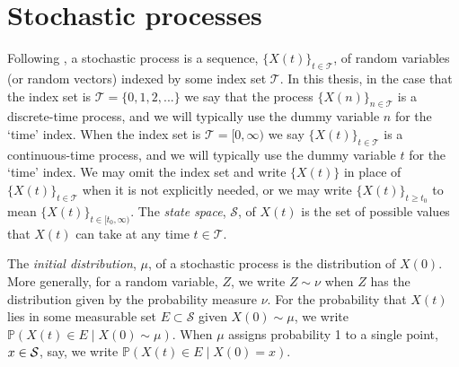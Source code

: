 		
\section{Stochastic processes}






Following \cite{rossBook}, a stochastic process is a sequence, \(\{X(t)\}_{t\in\mathcal T}\), of random variables (or random vectors) indexed by some index set \(\mathcal T\). In this thesis, in the case that the index set is \(\mathcal T=\{0,1,2,...\}\) we say that the process \(\{X(n)\}_{n\in \mathcal T}\) is a discrete-time process, and we will typically use the dummy variable \(n\) for the `time' index. When the index set is \(\mathcal T=[0,\infty)\) we say \(\{X(t)\}_{t\in\mathcal T}\) is a continuous-time process, and we will typically use the dummy variable \(t\) for the `time' index. We may omit the index set and write \(\{X(t)\}\) in place of \(\{X(t)\}_{t\in\mathcal T}\) when it is not explicitly needed, or we may write \(\{X(t)\}_{t\geq t_0}\) to mean \(\{X(t)\}_{t\in[t_0,\infty)}\). The \emph{state space}, \(\mathcal S\), of \(X(t)\) is the set of possible values that \(X(t)\) can take at any time \(t\in\mathcal T\).

The \emph{initial distribution}, \(\mu\), of a stochastic process is the distribution of \(X(0)\). More generally, for a random variable, \(Z\), we write \(Z\sim \nu\) when \(Z\) has the distribution given by the probability measure \(\nu\). For the probability that \(X(t)\) lies in some measurable set \(E\subset \mathcal S\) given \(X(0)\sim \mu\), we write \(\mathbb P(X(t)\in E \mid X(0)\sim \mu)\). When \(\mu\) assigns probability 1 to a single point, \(x\in\mathcal{S}\), say, we write \(\mathbb P(X(t)\in E \mid X(0)=x).\) 

